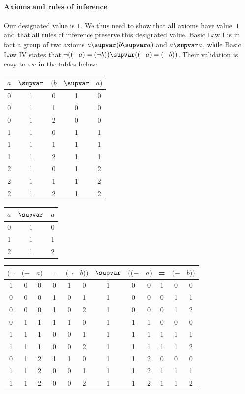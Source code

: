 \documentclass{preprint}
\renewcommand{\to}{\supvar}
\begin{document}
\paragraph{Axioms and rules of inference} 
Our designated value is $1$. We thus need to show that all axioms have value~$1$ and that all rules of inference preserve this designated value. 
Basic Law I is in fact a group of two axioms $a \to (b \to a )$ and $a \to a$, while Basic Law IV states that $\neg ((-a)=(\neg b)) \to ((-a) = (-b))$. 
Their validation is easy to see in the tables below: 


\begin{center}
	\begin{tabular}{c c c c c }
		$a $ & $\to$ & $(b$ & $\to$ & $a )$ \\
		\hline
		0 & 1 & 	0 	& 1 & 0\\
		0 & 1 & 	1 	& 0 & 0\\
		0 & 1 & 	2 	& 0 & 0\\
		1 & 1 & 	0 	& 1 & 1\\
		1 & 1 & 	1 	& 1 & 1\\
		1 & 1 & 	2 	& 1 & 1\\
		2 & 1 & 	0 	& 1 & 2\\
		2 & 1 & 	1 	& 1 & 2\\
		2 & 1 & 	2 	& 1 & 2\\
	\end{tabular}
	\qquad 
	\begin{tabular}{c c c  }
		$a $ & $\to$ & $a $ \\
		\hline
		0 & 1 &  0\\
		1 & 1 &  1\\
		2 & 1 &  2\\
	\end{tabular}
\end{center}
%
\begin{center}
	\begin{tabular}{c c c c c c c c c c c c}
		$(\neg $ & $(-$ & $a)$ & $=$ & $(\neg$ & $b))$ & $\to$ & $((-$ & $a )$ & = & $(-$ & $b ))$ \\
		\hline
		1 & 0 & 	0 	& 0 & 1& 	0& 	1 & 0 & 	0& 		1& 0& 	0\\
		0 & 0 & 	0 	& 1 & 0& 	1& 	1 & 0 & 	0& 		0& 1& 	1\\
		0 & 0 & 	0 	& 1 & 0& 	2& 	1 & 0 & 	0& 		0& 1& 	2\\
		0 & 1 & 	1 	& 1 & 1& 	0& 	1 & 1 & 	1& 		0& 0& 	0\\
		1 & 1 & 	1 	& 0 & 0& 	1& 	1 & 1 & 	1& 		1& 1& 	1\\
		1 & 1 & 	1 	& 0 & 0& 	2& 	1 & 1 & 	1& 		1& 1& 	2\\
		0 & 1 & 	2 	& 1 & 1& 	0& 	1 & 1 & 	2& 		0& 0& 	0\\
		1 & 1 & 	2 	& 0 & 0& 	1& 	1 & 1 & 	2& 		1& 1& 	1\\
		1 & 1 & 	2 	& 0 & 0& 	2& 	1 & 1 & 	2& 		1& 1& 	2\\
	\end{tabular}
\end{center}
\end{document}

